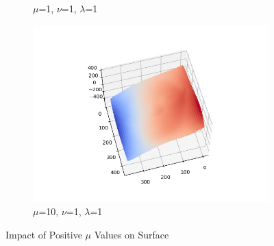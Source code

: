 \documentclass{article}
\begin{document}
\begin{figure}[H]
\begin{subfigure}{0.32\textwidth}
		\caption{$\mu$=1, $\nu$=1, $\lambda$=1}
	\end{subfigure}
	\hfill
	\begin{subfigure}{0.32\textwidth}
		\centering
		\includegraphics[width=\textwidth]{./src/2f_mu_change/faceCalibrated_mu_10_v_1_lambda_1.png}
		\caption{$\mu$=10, $\nu$=1, $\lambda$=1}
	\end{subfigure}
	
	\caption{Impact of Positive $\mu$ Values on Surface}
	\label{fig:u_p_vl}
\end{figure}
\end{document}
